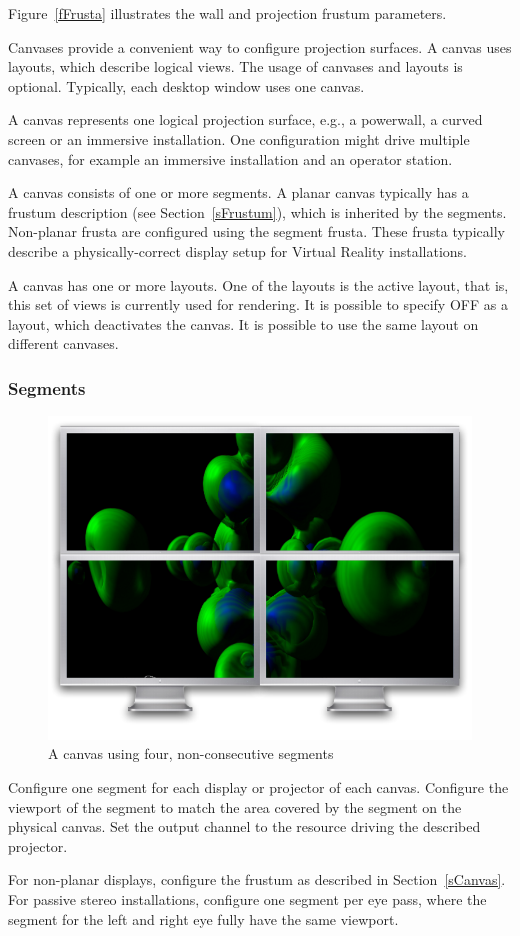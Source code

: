 \documentclass[10pt,a4]{scrartcl}
\newcommand{\fig}[1]{Figure~\ref{#1}}
\newcommand{\sref}[1]{Section~\ref{#1}}
\begin{document}
\fig{fFrusta} illustrates the wall and projection frustum parameters.

Canvases provide a convenient way to configure projection surfaces. A
canvas uses layouts, which describe logical views. The usage of canvases
and layouts is optional. Typically, each desktop window uses one canvas.

A canvas represents one logical projection surface, e.g., a powerwall, a
curved screen or an immersive installation. One configuration might
drive multiple canvases, for example an immersive installation and an
operator station.

A canvas consists of one or more segments. A planar canvas typically has
a frustum description (see \sref{sFrustum}), which is inherited by the
segments. Non-planar frusta are configured using the segment
frusta. These frusta typically describe a physically-correct display
setup for Virtual Reality installations.

A canvas has one or more layouts. One of the layouts is the active
layout, that is, this set of views is currently used for rendering. It
is possible to specify \textsf{OFF} as a layout, which deactivates the
canvas. It is possible to use the same layout on different canvases.

\subsubsection{Segments}

\begin{figure}
  \includegraphics[width=.382\textwidth]{images/canvas.pdf}
  {\caption{\label{fCanvas}A canvas using four, non-consecutive segments}}
\end{figure}

Configure one \textsf{segment} for each display or projector of each
canvas. Configure the \textsf{viewport} of the segment to match the area
covered by the segment on the physical canvas. Set the output
\textsf{channel} to the resource driving the described projector.

For non-planar displays, configure the frustum as described in
\sref{sCanvas}. For passive stereo installations, configure one segment
per eye pass, where the segment for the left and right eye fully
have the same viewport.
\end{document}
